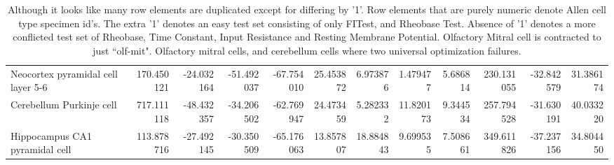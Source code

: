 \begin{table}
{\begin{tabular}{lrrrrrrrrrrr}
Neocortex pyramidal cell layer 5-6 &  170.450121 & -24.032164 & -51.492037 & -67.754010 &  25.453872 &   6.973876 &   1.479477 &  5.686814 &  230.131055 & -32.842579 &    31.386174 \\
Cerebellum Purkinje cell           &  717.111118 & -48.432357 & -34.206502 & -62.769947 &  24.473459 &   5.282332 &  11.820173 &  9.344534 &  257.794528 & -31.630191 &    40.033220 \\
Hippocampus CA1 pyramidal cell     &  113.878716 & -27.492145 & -30.350509 & -65.176063 &  13.857807 &  18.884843 &   9.699535 &  7.508661 &  349.611826 & -37.237156 &    34.804450 \\
\bottomrule
\end{tabular}}
\caption[]{Although it looks like many row elements are duplicated except for differing by '1'. Row elements that are purely numeric denote Allen cell type specimen id's. The extra '1' denotes an easy test set consisting of only FITest, and Rheobase Test. Absence of '1'  denotes a more conflicted test set of Rheobase, Time Constant, Input Resistance and Resting Membrane Potential. Olfactory Mitral cell is contracted to just ``olf-mit". Olfactory mitral cells, and cerebellum cells where two universal optimization failures.}
\end{table}


